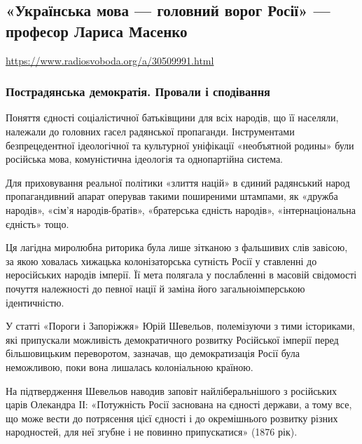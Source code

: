  
 

\subsection{«Українська мова --- головний ворог Росії» --- професор Лариса Масенко}
\label{sec:26_03_2020.news.ua.radio_svoboda.1_masenko_mova}

\url{https://www.radiosvoboda.org/a/30509991.html}

\subsubsection{Пострадянська демократія. Провали і сподівання}

Поняття єдності соціалістичної батьківщини для всіх народів, що її населяли,
належали до головних гасел радянської пропаганди. Інструментами безпрецедентної
ідеологічної та культурної уніфікації «необъятной родины» були російська мова,
комуністична ідеологія та однопартійна система.

Для приховування реальної політики «злиття націй» в єдиний радянський народ
пропагандивний апарат оперував такими поширеними штампами, як «дружба народів»,
«сім’я народів-братів», «братерська єдність народів», «інтернаціональна
єдність» тощо.

Ця лагідна миролюбна риторика була лише зітканою з фальшивих слів завісою, за
якою ховалась хижацька колонізаторська сутність Росії у ставленні до
неросійських народів імперії. Її мета полягала у послабленні в масовій
свідомості почуття належності до певної нації й заміна його загальноімперською
ідентичністю.

У статті «Пороги і Запоріжжя» Юрій Шевельов, полемізуючи з тими істориками, які
припускали можливість демократичного розвитку Російської імперії перед
більшовицьким переворотом, зазначав, що демократизація Росії була неможливою,
поки вона лишалась колоніальною країною.

На підтвердження Шевельов наводив заповіт найліберальнішого з російських царів
Олекандра ІІ: «Потужність Росії заснована на єдності держави, а тому все, що
може вести до потрясення цієї єдності і до окремішнього розвитку різних
народностей, для неї згубне і не повинно припускатися» (1876 рік).

